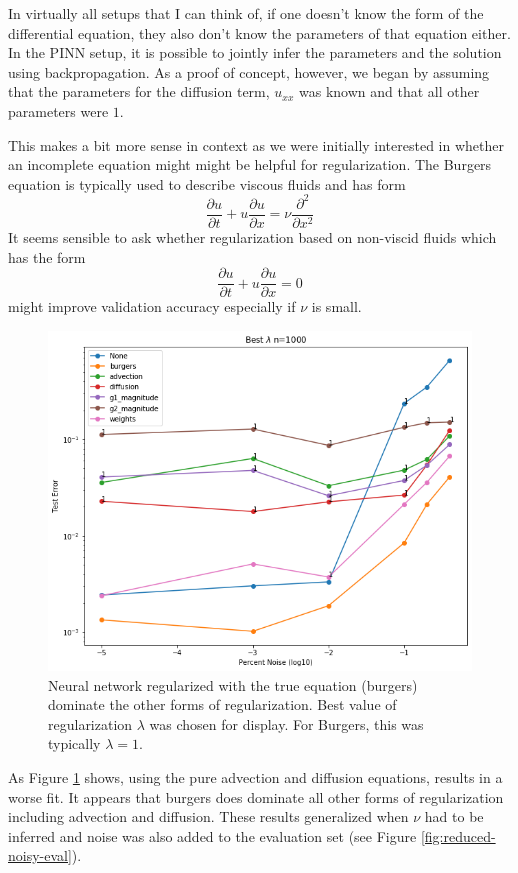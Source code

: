 \documentclass[12pt, fullpage,letterpaper]{article}
\begin{document}
In virtually all setups that I can think of, if one doesn't know the form of the differential equation, they also don't know the parameters of that equation either. In the PINN setup, it is possible to jointly infer the parameters and the solution using backpropagation. As a proof of concept, however, we began by assuming that the parameters for the diffusion term, $u_{xx}$ was known and that all other parameters were $1$. 

This makes a bit more sense in context as we were initially interested in whether an incomplete equation might might be helpful for regularization. The Burgers equation is typically used to describe viscous fluids and has form
\[
    \frac{\partial u}{\partial t} + u \frac{\partial u}{\partial x} = \nu \frac{\partial^2}{\partial x^2}
\]
It seems sensible to ask whether regularization based on non-viscid fluids which has the form
\[
    \frac{\partial u}{\partial t} + u \frac{\partial u}{\partial x} = 0
\]
might improve validation accuracy especially if $\nu$ is small.

\begin{figure}[!htb]
    \centering
    \includegraphics[width=\textwidth]{reduced-scaling-1000}
    \caption{Neural network regularized with the true equation (burgers) dominate the other forms of regularization. Best value of regularization $\lambda$ was chosen for display. For Burgers, this was typically $\lambda = 1$.}
    \label{fig:reduced-scaling}
\end{figure}

As Figure \ref{fig:reduced-scaling} shows, using the pure advection and diffusion equations, results in a worse fit. It appears that burgers does dominate all other forms of regularization including advection and diffusion. These results generalized when $\nu$ had to be inferred and noise was also added to the evaluation set (see Figure \ref{fig:reduced-noisy-eval}).
\end{document}
